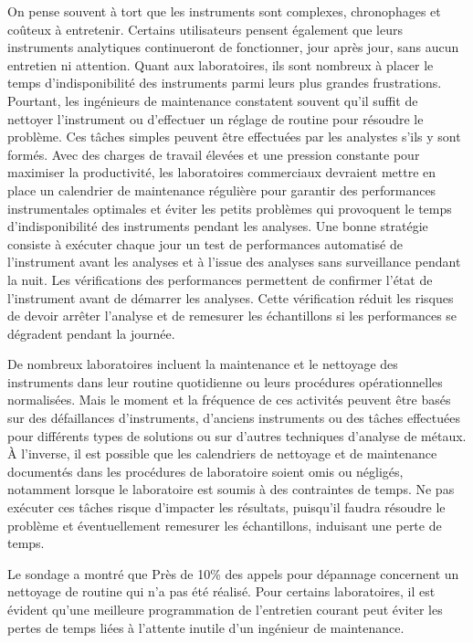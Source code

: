 On pense souvent à tort que les instruments sont complexes, chronophages et coûteux à entretenir.
Certains utilisateurs pensent également que leurs instruments analytiques continueront de 
fonctionner, jour après jour, sans aucun entretien ni attention. 
Quant aux laboratoires, ils sont nombreux à placer le temps d'indisponibilité des 
instruments parmi leurs plus grandes frustrations. Pourtant, les ingénieurs de maintenance 
constatent souvent qu’il suffit de nettoyer l’instrument ou d’effectuer un réglage de routine 
pour résoudre le problème. Ces tâches simples peuvent être effectuées par les analystes s’ils y 
sont formés. Avec des charges de travail élevées et une pression constante pour maximiser 
la productivité, les laboratoires commerciaux devraient mettre en place un calendrier de 
maintenance régulière pour garantir des performances instrumentales optimales et éviter 
les petits problèmes qui provoquent le temps d'indisponibilité des instruments pendant 
les analyses. Une bonne stratégie consiste à exécuter chaque jour un test de performances 
automatisé de l’instrument avant les analyses et à l’issue des analyses sans surveillance 
pendant la nuit. Les vérifications des performances permettent de confirmer l’état de l’instrument 
avant de démarrer les analyses. Cette vérification réduit les risques de devoir arrêter 
l’analyse et de remesurer les échantillons si les performances se dégradent pendant la journée.

De nombreux laboratoires incluent la maintenance et le nettoyage des instruments dans leur routine quotidienne ou leurs procédures opérationnelles normalisées. Mais le moment et la fréquence de ces activités peuvent être basés sur des défaillances d’instruments, d’anciens instruments ou des tâches effectuées pour différents types de solutions ou sur d’autres techniques d’analyse de métaux. À l’inverse, il est possible que les calendriers de nettoyage et de maintenance documentés dans les procédures de laboratoire soient omis ou négligés, notamment lorsque le laboratoire est soumis à des contraintes de temps. Ne pas exécuter ces tâches risque d’impacter les résultats, puisqu’il faudra résoudre le problème et éventuellement remesurer les échantillons, induisant une perte de temps.

Le sondage a montré que Près de 10\% des appels pour dépannage concernent un nettoyage de routine 
qui n’a pas été réalisé. Pour certains laboratoires, il est évident qu’une meilleure programmation 
de l’entretien courant peut éviter les pertes de temps liées à l’attente inutile d’un ingénieur de 
maintenance.

